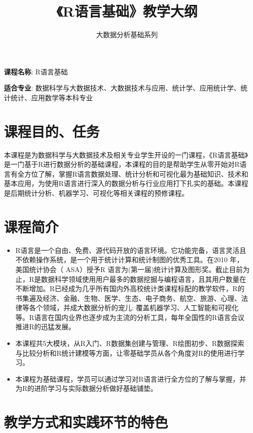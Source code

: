 \documentclass[12pt,hyperref,]{ctexart}
\title{《R语言基础》教学大纲}
\author{大数据分析基础系列}
\date{}
\begin{document}
\maketitle

{
\setcounter{tocdepth}{2}
\tableofcontents
}
\newpage

\noindent\textbf{课程名称}: R语言基础

\noindent\textbf{适合专业}:
数据科学与大数据技术、大数据技术与应用、统计学、应用统计学、统计统计、应用数学等本科专业

\section{课程目的、任务}

本课程是为数据科学与大数据技术及相关专业学生开设的一门课程，《R语言基础》是一门基于R进行数据分析的基础课程，本课程的目的是帮助学生从零开始对R语言有全方位了解，掌握R语言数据处理、统计分析和可视化最为基础知识、技术和基本应用，为使用R语言进行深入的数据分析与行业应用打下扎实的基础。本课程是后期统计分析、机器学习、可视化等相关课程的预修课程。

\section{课程简介}

\begin{itemize}
\item
  R语言是一个自由、免费、源代码开放的语言环境。它功能完备，语言灵活且不依赖操作系统，是一个用于统计计算和统计制图的优秀工具。在2010
  年，美国统计协会（ ASA）授予R
  语言为(第⼀届)统计计算及图形奖。截止目前为止，R是数据科学领域使用用户最多的数据挖掘与编程语言，且其用户数量在不断增加。R已经成为几乎所有国内外高校统计类课程标配的教学软件，R的书集遍及经济、金融、生物、医学、生态、电子商务、航空、旅游、心理、法律等各个领域，并成大数据分析的宠儿:
  覆盖机器学习、人工智能和可视化等。R语言在国内业界也逐步成为主流的分析工具，每年全国性的R语言会议推进R的迅猛发展。
\item
  本课程共5大模块，从R入门、R数据集创建与管理、R绘图初步、R数据探索与比较分析和R统计建模等方面，让零基础学员从各个角度对R的使用进行学习。
\item
  本课程为基础课程，学员可以通过学习对R语言进行全方位的了解与掌握，并为R的进阶学习与实际数据分析做好基础铺垫。
\end{itemize}

\section{教学方式和实践环节的特色}
\end{document}
